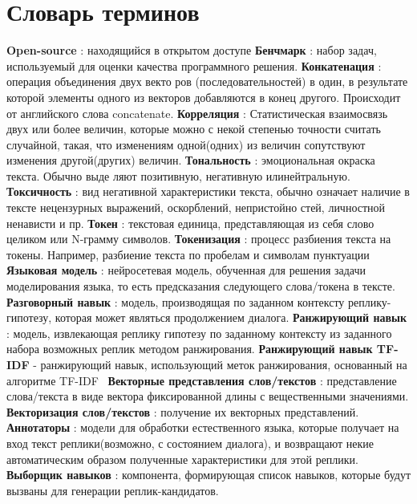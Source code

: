 
\chapter*{Словарь терминов} %
\textbf{Open-source} : находящийся в открытом доступе 
\textbf{Бенчмарк} : набор задач, используемый для оценки качества программного решения. 
\textbf{Конкатенация} : операция объединения двух векто
ров (последовательностей) в один, в результате которой элементы одного из векторов добавляются в конец другого. Происходит от английского слова concatenate. 
\textbf{Корреляция} : Статистическая взаимосвязь двух или более величин, которые можно с некой степенью точности считать случайной, такая, что изменениям одной(одних) из величин сопутствуют изменения другой(других) величин. 
\textbf{Тональность} : эмоциональная окраска текста. Обычно выде
ляют позитивную, негативную илинейтральную.
\textbf{Токсичность} : вид негативной характеристики текста, обычно
означает наличие в тексте нецензурных выражений, оскорблений, непристойно
стей, личностной ненависти и пр.
\textbf{Токен} : текстовая единица, представляющая из себя слово целиком или N-грамму символов.
\textbf{Токенизация} : процесс разбиения текста на токены. Например, разбиение
текста по пробелам и символам пунктуации
\textbf{Языковая модель} : нейросетевая модель, обученная для решения задачи моделирования языка, то есть предсказания следующего
слова/токена в тексте.
 \textbf{Разговорный навык} : модель, производящая по
заданном контексту реплику-гипотезу, которая может являться продолжением диалога.
\textbf{Ранжирующий навык} : модель, извлекающая реплику гипотезу по заданному контексту из заданного набора возможных реплик методом ранжирования.
\textbf{Ранжирующий навык TF-IDF} - ранжирующий навык, использующий меток ранжирования, основанный на алгоритме TF-IDF~\cite{tfidf} 
\textbf{Векторные представления слов/текстов} : представление слова/текста в виде вектора фиксированной длины с вещественными
значениями.  
\textbf{Векторизация слов/текстов} : получение их векторных представлений. 
\textbf{Аннотаторы} : модели для обработки естественного языка, которые получает на вход текст реплики(возможно, с состоянием диалога), и возвращают некие автоматическим образом полученные характеристики для этой реплики. 
\textbf{Выборщик навыков} : компонента, формирующая список навыков, которые будут вызваны для генерации реплик-кандидатов.
